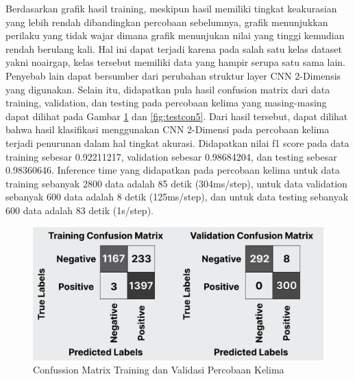 Berdasarkan grafik hasil training, meskipun hasil memiliki tingkat keakurasian yang lebih rendah dibandingkan percobaan sebelumnya, grafik menunjukkan perilaku yang tidak wajar dimana grafik menunjukan nilai yang tinggi kemudian rendah berulang kali. Hal ini dapat terjadi karena pada salah satu kelas dataset yakni noairgap, kelas tersebut memiliki data yang hampir serupa satu sama lain. Penyebab lain dapat bersumber dari perubahan struktur layer CNN 2-Dimensis yang digunakan. Selain itu, didapatkan pula hasil confusion matrix dari data training, validation, dan testing pada percobaan kelima yang masing-masing dapat dilihat pada Gambar \ref{fig:tvcon5} dan \ref{fig:testcon5}. Dari hasil tersebut, dapat dilihat bahwa hasil klasifikasi menggunakan CNN 2-Dimensi pada percobaan kelima terjadi penurunan dalam hal tingkat akurasi. Didapatkan nilai f1 score pada data training sebesar 0.92211217, validation sebesar 0.98684204, dan testing sebesar 0.98360646. Inference time yang didapatkan pada percobaan kelima untuk data training sebanyak 2800 data adalah 85 detik (304ms/step), untuk data validation sebanyak 600 data adalah 8 detik (125ms/step), dan untuk data testing sebanyak 600 data adalah 83 detik (1s/step).

\begin{figure} [H] \centering
    \includegraphics[scale=0.3]{gambar/bab4/tvcon5.png}
    \caption{Confussion Matrix Training dan Validasi Percobaan Kelima}
    \label{fig:tvcon5}
\end{figure}

